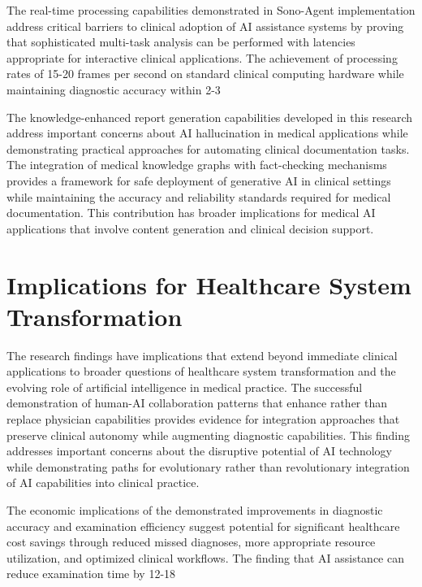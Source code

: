 The real-time processing capabilities demonstrated in Sono-Agent implementation address critical barriers to clinical adoption of AI assistance systems by proving that sophisticated multi-task analysis can be performed with latencies appropriate for interactive clinical applications. The achievement of processing rates of 15-20 frames per second on standard clinical computing hardware while maintaining diagnostic accuracy within 2-3%

The knowledge-enhanced report generation capabilities developed in this research address important concerns about AI hallucination in medical applications while demonstrating practical approaches for automating clinical documentation tasks. The integration of medical knowledge graphs with fact-checking mechanisms provides a framework for safe deployment of generative AI in clinical settings while maintaining the accuracy and reliability standards required for medical documentation. This contribution has broader implications for medical AI applications that involve content generation and clinical decision support.

\section{Implications for Healthcare System Transformation}

The research findings have implications that extend beyond immediate clinical applications to broader questions of healthcare system transformation and the evolving role of artificial intelligence in medical practice. The successful demonstration of human-AI collaboration patterns that enhance rather than replace physician capabilities provides evidence for integration approaches that preserve clinical autonomy while augmenting diagnostic capabilities. This finding addresses important concerns about the disruptive potential of AI technology while demonstrating paths for evolutionary rather than revolutionary integration of AI capabilities into clinical practice.

The economic implications of the demonstrated improvements in diagnostic accuracy and examination efficiency suggest potential for significant healthcare cost savings through reduced missed diagnoses, more appropriate resource utilization, and optimized clinical workflows. The finding that AI assistance can reduce examination time by 12-18%

